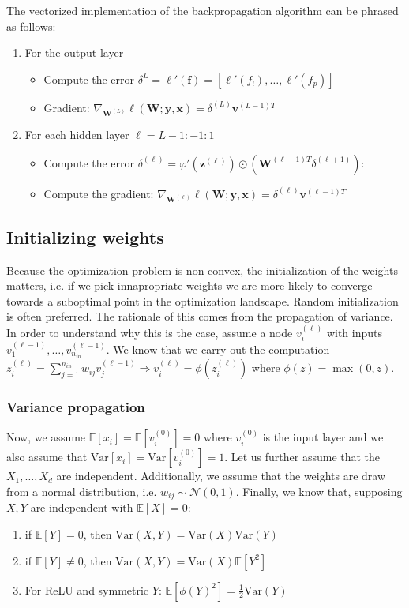 \documentclass[a4paper,10pt,twoside]{article}
\begin{document}
The vectorized implementation of the backpropagation algorithm can be phrased as follows:
\begin{enumerate}
    \item For the output layer
    \begin{itemize}
        \item Compute the error $\delta^{L}=\mathbf{\ell'(f)}=[\ell'(f_!),\dots, \ell'(f_p)]$
        \item Gradient: $\nabla_{\mathbf{W}^{(L)}}\ell(\mathbf{W};\mathbf{y},\mathbf{x})=\delta^{(L)}\mathbf{v}^{(L-1)T}$
    \end{itemize}
    \item For each hidden layer $\ell=L-1:-1:1$
    \begin{itemize}
        \item Compute the error $\delta^{(\ell)}=\varphi'(\mathbf{z}^{(\ell)})\odot(\mathbf{W}^{(\ell +1) T}\delta^{(\ell+1)})$:
        \item Compute the gradient: $\nabla_{\mathbf{W}^{(\ell)}}\ell(\mathbf{W};\mathbf{y},\mathbf{x})=\delta^{(\ell)}\mathbf{v}^{(\ell-1)T}$
    \end{itemize}
\end{enumerate}

\subsection{Initializing weights}

Because the optimization problem is non-convex, the initialization of the weights matters, i.e. if we pick innapropriate weights we are more likely to converge towards a suboptimal point in the optimization landscape. Random initialization is often preferred. The rationale of this comes from the propagation of variance. In order to understand why this is the case, assume a node $v_i^{(\ell)}$ with inputs $v_1^{(\ell -1)},\ldots,v_{n_{in}}^{(\ell -1)}$. We know that we carry out the computation $z_i^{(\ell)}=\sum_{j=1}^{n_{in}}w_{ij}v_j^{(\ell-1)}\Rightarrow v_i^{(\ell)}=\phi(z_i^{(\ell)})$ where $\phi(z)=\max(0,z)$.

\subsubsection{Variance propagation}

Now, we assume $\mathbb{E}[x_i]=\mathbb{E}[v_i^{(0)}]=0$ where $v_i^{(0)}$ is the input layer and we also assume that $\text{Var}[x_i]=\text{Var}[v_i^{(0)}]=1$. Let us further assume that the $X_1, \ldots, X_d$ are independent. Additionally, we assume that the weights are draw from a normal distribution, i.e. $w_{ij}\sim\mathcal{N}(0,1)$. Finally, we know that, supposing $X,Y$ are independent with $\mathbb{E}[X]=0$:
\begin{enumerate}[a]
    \item if $\mathbb{E}[Y]=0$, then $\text{Var}(X,Y)=\text{Var}(X)\text{Var}(Y)$
    \item if $\mathbb{E}[Y]\neq 0$, then $\text{Var}(X,Y)=\text{Var}(X)\mathbb{E}[Y^2]$
    \item For ReLU and symmetric $Y$: $\mathbb{E}[\phi(Y)^2]=\frac{1}{2}\text{Var}(Y)$
\end{enumerate}
\end{document}
